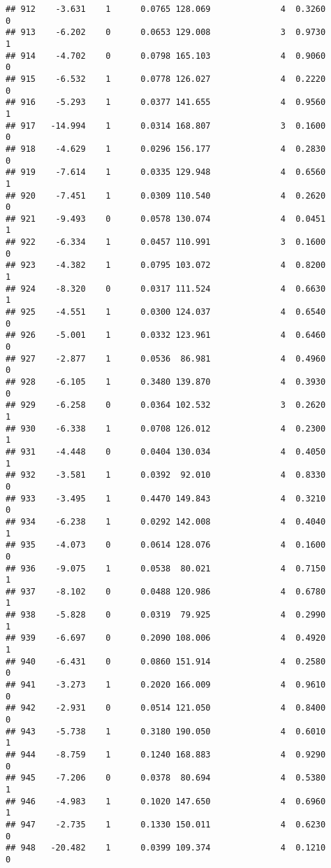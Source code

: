 \documentclass[
]{article}
\begin{document}
\begin{verbatim}
## 912    -3.631    1      0.0765 128.069              4  0.3260      0
## 913    -6.202    0      0.0653 129.008              3  0.9730      1
## 914    -4.702    0      0.0798 165.103              4  0.9060      0
## 915    -6.532    1      0.0778 126.027              4  0.2220      0
## 916    -5.293    1      0.0377 141.655              4  0.9560      1
## 917   -14.994    1      0.0314 168.807              3  0.1600      0
## 918    -4.629    1      0.0296 156.177              4  0.2830      0
## 919    -7.614    1      0.0335 129.948              4  0.6560      1
## 920    -7.451    1      0.0309 110.540              4  0.2620      0
## 921    -9.493    0      0.0578 130.074              4  0.0451      1
## 922    -6.334    1      0.0457 110.991              3  0.1600      0
## 923    -4.382    1      0.0795 103.072              4  0.8200      1
## 924    -8.320    0      0.0317 111.524              4  0.6630      1
## 925    -4.551    1      0.0300 124.037              4  0.6540      0
## 926    -5.001    1      0.0332 123.961              4  0.6460      0
## 927    -2.877    1      0.0536  86.981              4  0.4960      0
## 928    -6.105    1      0.3480 139.870              4  0.3930      0
## 929    -6.258    0      0.0364 102.532              3  0.2620      1
## 930    -6.338    1      0.0708 126.012              4  0.2300      1
## 931    -4.448    0      0.0404 130.034              4  0.4050      1
## 932    -3.581    1      0.0392  92.010              4  0.8330      0
## 933    -3.495    1      0.4470 149.843              4  0.3210      0
## 934    -6.238    1      0.0292 142.008              4  0.4040      1
## 935    -4.073    0      0.0614 128.076              4  0.1600      0
## 936    -9.075    1      0.0538  80.021              4  0.7150      1
## 937    -8.102    0      0.0488 120.986              4  0.6780      1
## 938    -5.828    0      0.0319  79.925              4  0.2990      1
## 939    -6.697    0      0.2090 108.006              4  0.4920      1
## 940    -6.431    0      0.0860 151.914              4  0.2580      0
## 941    -3.273    1      0.2020 166.009              4  0.9610      0
## 942    -2.931    0      0.0514 121.050              4  0.8400      0
## 943    -5.738    1      0.3180 190.050              4  0.6010      1
## 944    -8.759    1      0.1240 168.883              4  0.9290      0
## 945    -7.206    0      0.0378  80.694              4  0.5380      1
## 946    -4.983    1      0.1020 147.650              4  0.6960      1
## 947    -2.735    1      0.1330 150.011              4  0.6230      0
## 948   -20.482    1      0.0399 109.374              4  0.1210      0

\end{verbatim}
\end{document}
